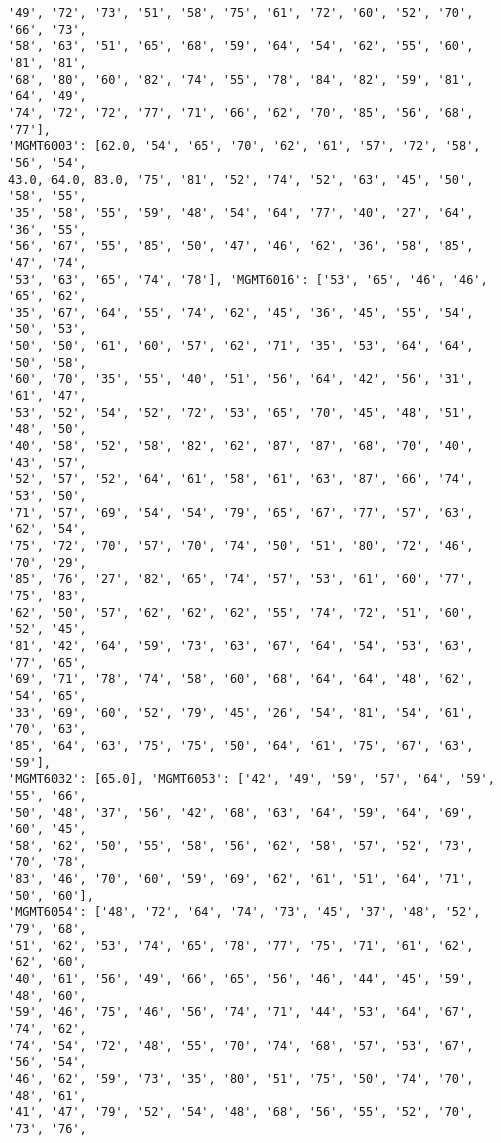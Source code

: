 \documentclass[11pt]{article}
\begin{document}
\begin{Verbatim}[commandchars=\\\{\}]
'49', '72', '73', '51', '58', '75', '61', '72', '60', '52', '70', '66', '73',
'58', '63', '51', '65', '68', '59', '64', '54', '62', '55', '60', '81', '81',
'68', '80', '60', '82', '74', '55', '78', '84', '82', '59', '81', '64', '49',
'74', '72', '72', '77', '71', '66', '62', '70', '85', '56', '68', '77'],
'MGMT6003': [62.0, '54', '65', '70', '62', '61', '57', '72', '58', '56', '54',
43.0, 64.0, 83.0, '75', '81', '52', '74', '52', '63', '45', '50', '58', '55',
'35', '58', '55', '59', '48', '54', '64', '77', '40', '27', '64', '36', '55',
'56', '67', '55', '85', '50', '47', '46', '62', '36', '58', '85', '47', '74',
'53', '63', '65', '74', '78'], 'MGMT6016': ['53', '65', '46', '46', '65', '62',
'35', '67', '64', '55', '74', '62', '45', '36', '45', '55', '54', '50', '53',
'50', '50', '61', '60', '57', '62', '71', '35', '53', '64', '64', '50', '58',
'60', '70', '35', '55', '40', '51', '56', '64', '42', '56', '31', '61', '47',
'53', '52', '54', '52', '72', '53', '65', '70', '45', '48', '51', '48', '50',
'40', '58', '52', '58', '82', '62', '87', '87', '68', '70', '40', '43', '57',
'52', '57', '52', '64', '61', '58', '61', '63', '87', '66', '74', '53', '50',
'71', '57', '69', '54', '54', '79', '65', '67', '77', '57', '63', '62', '54',
'75', '72', '70', '57', '70', '74', '50', '51', '80', '72', '46', '70', '29',
'85', '76', '27', '82', '65', '74', '57', '53', '61', '60', '77', '75', '83',
'62', '50', '57', '62', '62', '62', '55', '74', '72', '51', '60', '52', '45',
'81', '42', '64', '59', '73', '63', '67', '64', '54', '53', '63', '77', '65',
'69', '71', '78', '74', '58', '60', '68', '64', '64', '48', '62', '54', '65',
'33', '69', '60', '52', '79', '45', '26', '54', '81', '54', '61', '70', '63',
'85', '64', '63', '75', '75', '50', '64', '61', '75', '67', '63', '59'],
'MGMT6032': [65.0], 'MGMT6053': ['42', '49', '59', '57', '64', '59', '55', '66',
'50', '48', '37', '56', '42', '68', '63', '64', '59', '64', '69', '60', '45',
'58', '62', '50', '55', '58', '56', '62', '58', '57', '52', '73', '70', '78',
'83', '46', '70', '60', '59', '69', '62', '61', '51', '64', '71', '50', '60'],
'MGMT6054': ['48', '72', '64', '74', '73', '45', '37', '48', '52', '79', '68',
'51', '62', '53', '74', '65', '78', '77', '75', '71', '61', '62', '62', '60',
'40', '61', '56', '49', '66', '65', '56', '46', '44', '45', '59', '48', '60',
'59', '46', '75', '46', '56', '74', '71', '44', '53', '64', '67', '74', '62',
'74', '54', '72', '48', '55', '70', '74', '68', '57', '53', '67', '56', '54',
'46', '62', '59', '73', '35', '80', '51', '75', '50', '74', '70', '48', '61',
'41', '47', '79', '52', '54', '48', '68', '56', '55', '52', '70', '73', '76',

\end{Verbatim}
\end{document}
